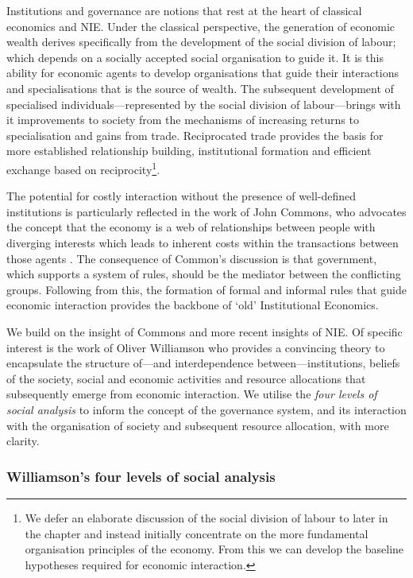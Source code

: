 Institutions and governance are notions that rest at the heart of classical economics and NIE. Under the classical perspective, the generation of economic wealth derives specifically from the development of the social division of labour; which depends on a socially accepted social organisation to guide it. It is this ability for economic agents to develop organisations that guide their interactions and specialisations that is the source of wealth. The subsequent development of specialised individuals---represented by the social division of labour---brings with it improvements to society from the mechanisms of increasing returns to specialisation and gains from trade. Reciprocated trade provides the basis for more established relationship building, institutional formation and efficient exchange based on reciprocity\footnote{We defer an elaborate discussion of the social division of labour to later in the chapter and instead initially concentrate on the more fundamental organisation principles of the economy. From this we can develop the baseline hypotheses required for economic interaction.}.

The potential for costly interaction without the presence of well-defined institutions is particularly reflected in the work of John Commons, who advocates the concept that the economy is a web of relationships between people with diverging interests which leads to inherent costs within the transactions between those agents \citep{Commons1931, Commons1934}. The consequence of Common's discussion is that government, which supports a system of rules, should be the mediator between the conflicting groups. Following from this, the formation of formal and informal rules that guide economic interaction provides the backbone of `old' Institutional Economics. 

We build on the insight of Commons and more recent insights of NIE. Of specific interest is the work of Oliver Williamson who provides a convincing theory to encapsulate the structure of---and interdependence between---institutions, beliefs of the society, social and economic activities and resource allocations that subsequently emerge from economic interaction. We utilise the \emph{four levels of social analysis} \citep{Williamson2000} to inform the concept of the governance system, and its interaction with the organisation of society and subsequent resource allocation, with more clarity.

\subsubsection{Williamson's four levels of social analysis}

